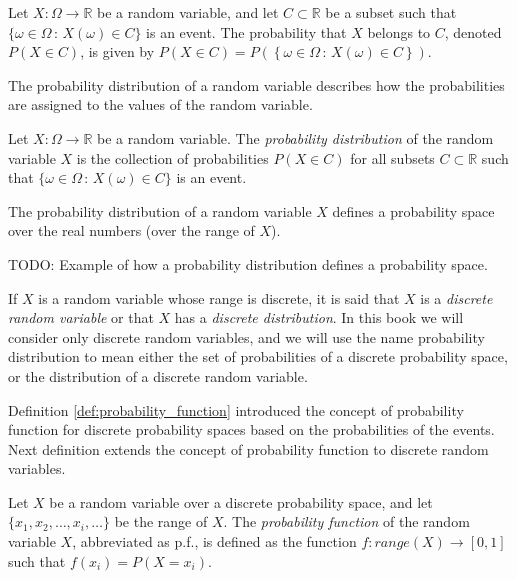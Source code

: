 \begin{definition}
Let $X : \Omega \rightarrow \mathbb{R}$ be a random variable, and let $C \subset \mathbb{R}$ be a subset such that $\{ \omega \in \Omega \,:\, X \left( \omega \right) \in C\}$ is an event. The probability that $X$ belongs to $C$, denoted $P\left(X \in C \right)$, is given by $P\left( X \in C \right)=P \left( \left\{ \omega \in \Omega \,:\, X \left( \omega \right) \in C\right\} \right)$.
\end{definition}

The probability distribution of a random variable describes how the probabilities are assigned to the values of the random variable. 

\begin{definition}
Let $X : \Omega \rightarrow \mathbb{R}$ be a random variable. The \emph{probability distribution} of the random variable $X$ is the collection of probabilities $P\left( X \in C \right)$ for all subsets $C \subset \mathbb{R}$ such that $\{ \omega \in \Omega \,:\, X \left( \omega \right) \in C\}$ is an event.
\end{definition}

The probability distribution of a random variable $X$ defines a probability space over the real numbers (over the range of $X$). 

\begin{example}
{\color{red} TODO: Example of how a probability distribution defines a probability space.}
\end{example}

If $X$ is a random variable whose range is discrete, it is said that $X$ is a \emph{discrete random variable} or that $X$ has a \emph{discrete distribution}. In this book we will consider only discrete random variables, and we will use the name probability distribution to mean either the set of probabilities of a discrete probability space, or the distribution of a discrete random variable.

Definition \ref{def:probability_function} introduced the concept of probability function for discrete probability spaces based on the probabilities of the events. Next definition extends the concept of probability function to discrete random variables.

\begin{definition}
Let $X$ be a random variable over a discrete probability space, and let $\{ x_1, x_2, \ldots, x_i, \ldots \}$ be the range of $X$. The \emph{probability function} of the random variable $X$, abbreviated as p.f., is defined as the function $f : range \left( X \right) \rightarrow [0, 1]$ such that $f \left( x_i \right) = P \left( X = x_i \right)$.
\end{definition}

